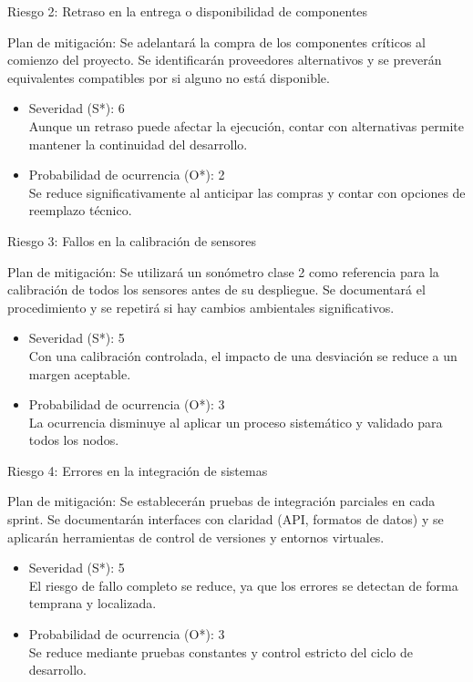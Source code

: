 \documentclass[
11pt, %
]{charter}
\begin{document}
Riesgo 2: Retraso en la entrega o disponibilidad de componentes

Plan de mitigación: Se adelantará la compra de los componentes críticos al comienzo del proyecto. Se identificarán proveedores alternativos y se preverán equivalentes compatibles por si alguno no está disponible.

\begin{itemize}
	\item Severidad (S*): 6\\
	Aunque un retraso puede afectar la ejecución, contar con alternativas permite mantener la continuidad del desarrollo.
	\item Probabilidad de ocurrencia (O*): 2\\
	Se reduce significativamente al anticipar las compras y contar con opciones de reemplazo técnico.
\end{itemize}

Riesgo 3: Fallos en la calibración de sensores

Plan de mitigación: Se utilizará un sonómetro clase 2 como referencia para la calibración de todos los sensores antes de su despliegue. Se documentará el procedimiento y se repetirá si hay cambios ambientales significativos.

\begin{itemize}
	\item Severidad (S*): 5\\
	Con una calibración controlada, el impacto de una desviación se reduce a un margen aceptable.
	\item Probabilidad de ocurrencia (O*): 3\\
	La ocurrencia disminuye al aplicar un proceso sistemático y validado para todos los nodos.
\end{itemize}

Riesgo 4: Errores en la integración de sistemas

Plan de mitigación: Se establecerán pruebas de integración parciales en cada sprint. Se documentarán interfaces con claridad (API, formatos de datos) y se aplicarán herramientas de control de versiones y entornos virtuales.

\begin{itemize}
	\item Severidad (S*): 5\\
	El riesgo de fallo completo se reduce, ya que los errores se detectan de forma temprana y localizada.
	\item Probabilidad de ocurrencia (O*): 3\\
	Se reduce mediante pruebas constantes y control estricto del ciclo de desarrollo.
\end{itemize}
\end{document}
